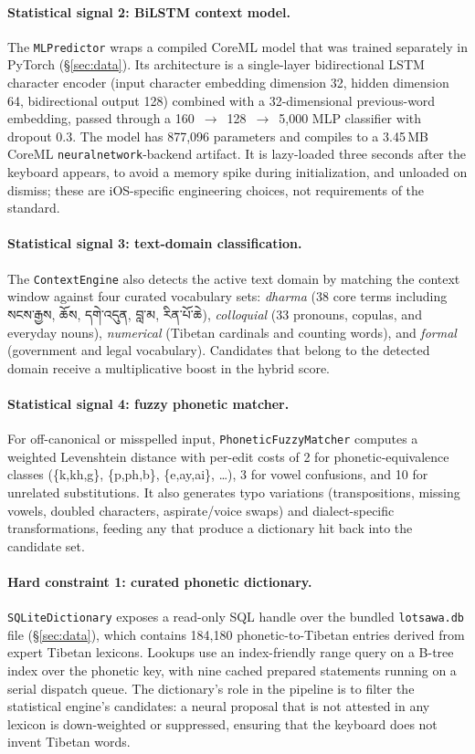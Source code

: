 \documentclass[11pt]{article}
\newcommand{\tib}[1]{{\fontspec{Jomolhari}#1}}
\begin{document}
\paragraph{Statistical signal 2: BiLSTM context model.}
The \texttt{MLPredictor} wraps a compiled CoreML model that was trained separately in PyTorch (\S\ref{sec:data}). Its architecture is a single-layer bidirectional LSTM character encoder (input character embedding dimension 32, hidden dimension 64, bidirectional output 128) combined with a 32-dimensional previous-word embedding, passed through a 160~$\to$~128~$\to$~5{,}000 MLP classifier with dropout 0.3. The model has 877{,}096 parameters and compiles to a 3.45\,MB CoreML \texttt{neuralnetwork}-backend artifact. It is lazy-loaded three seconds after the keyboard appears, to avoid a memory spike during initialization, and unloaded on dismiss; these are iOS-specific engineering choices, not requirements of the standard.

\paragraph{Statistical signal 3: text-domain classification.}
The \texttt{ContextEngine} also detects the active text domain by matching the context window against four curated vocabulary sets: \emph{dharma} (38 core terms including \tib{སངས་རྒྱས}, \tib{ཆོས}, \tib{དགེ་འདུན}, \tib{བླ་མ}, \tib{རིན་པོ་ཆེ}), \emph{colloquial} (33 pronouns, copulas, and everyday nouns), \emph{numerical} (Tibetan cardinals and counting words), and \emph{formal} (government and legal vocabulary). Candidates that belong to the detected domain receive a multiplicative boost in the hybrid score.

\paragraph{Statistical signal 4: fuzzy phonetic matcher.}
For off-canonical or misspelled input, \texttt{PhoneticFuzzyMatcher} computes a weighted Levenshtein distance with per-edit costs of 2 for phonetic-equivalence classes (\{k,kh,g\}, \{p,ph,b\}, \{e,ay,ai\}, \ldots), 3 for vowel confusions, and 10 for unrelated substitutions. It also generates typo variations (transpositions, missing vowels, doubled characters, aspirate/voice swaps) and dialect-specific transformations, feeding any that produce a dictionary hit back into the candidate set.

\paragraph{Hard constraint 1: curated phonetic dictionary.}
\texttt{SQLiteDictionary} exposes a read-only SQL handle over the bundled \texttt{lotsawa.db} file (\S\ref{sec:data}), which contains 184{,}180 phonetic-to-Tibetan entries derived from expert Tibetan lexicons. Lookups use an index-friendly range query on a B-tree index over the phonetic key, with nine cached prepared statements running on a serial dispatch queue. The dictionary's role in the pipeline is to filter the statistical engine's candidates: a neural proposal that is not attested in any lexicon is down-weighted or suppressed, ensuring that the keyboard does not invent Tibetan words.
\end{document}
